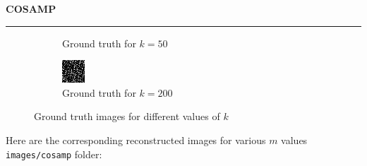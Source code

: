 \documentclass[a4paper,12pt]{article}
\newenvironment{solution}[2][]{%
    \begin{mdframed}[linecolor=blue!70!black, linewidth=2pt, roundcorner=10pt, backgroundcolor=yellow!10!white, skipabove=12pt, skipbelow=12pt]%
        \textbf{\large #2}
        \par\noindent\rule{\textwidth}{0.4pt}
}{
    \end{mdframed}
}
\begin{document}
\begin{solution}{COSAMP}
\begin{figure}[H]
\begin{subfigure}[t]{0.32\textwidth}
          \caption{Ground truth for $k = 50$}
      \end{subfigure}
      \begin{subfigure}[t]{0.32\textwidth}
          \centering
          \includegraphics[width=\textwidth]{../images/cosamp/Ground_truth_k_200.png}
          \caption{Ground truth for $k = 200$}
      \end{subfigure}
      \caption{Ground truth images for different values of $k$}
      \label{fig:ground_truth}
    \end{figure}
    
    Here are the corresponding reconstructed images for various $m$ values \texttt{images/cosamp} folder:
    

\end{solution}
\end{document}
